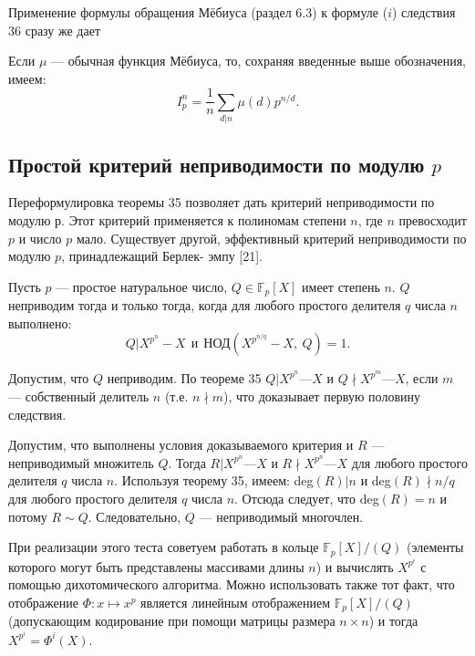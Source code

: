 Применение формулы обращения Мёбиуса (раздел 6.3) к формуле 
($i$) следствия 36 сразу же дает 

\begin{sled}
\hspace*{15pt}Если $\mu$ — обычная функция Мёбиуса, то, сохраняя введенные выше 
обозначения, имеем: 
\begin{equation*}
I^n_p = \frac{1}{n}\sum_{d|n}\mu(d)p^{n \slash d}.
\end{equation*}
\end{sled}
\newpage

\subsection{Простой критерий неприводимости по модулю $p$}
Переформулировка теоремы 35 позволяет дать критерий  
неприводимости по модулю $р$. Этот критерий применяется к полиномам степени 
$n$, где $n$ превосходит $p$ и число $p$ мало. Существует другой,  
эффективный критерий неприводимости по модулю $p$, принадлежащий Берлек- 
эмпу [21]. \newline\newline
\begin{sled}
\hspace*{15pt}Пусть $p$ — простое натуральное число, $Q \in \mathbb{F}_p [X]$ имеет степень $n$. $Q$ 
неприводим тогда и только тогда, когда для любого простого делителя 
$q$ числа $n$ выполнено: 
\begin{equation*}
Q|X^{p^n} - X\:\: \textit{и} \:\: \text{НОД}(X^{p^{n\slash q}} - X,\:Q)=1.
\end{equation*}
\end{sled}

\begin{myproof}
Допустим, что $Q$ неприводим. По теореме 35 $Q | X^{p^n} — X$ и 
$Q \nmid X^{p^m} — X$, если $m$ — собственный делитель $n$ (т.е. $n \nmid m$), что 
доказывает первую половину следствия.
 
\noindent Допустим, что выполнены условия доказываемого критерия и $R$ — 
неприводимый множитель $Q$. Тогда $R | X^{p^n} — X$ и $R \nmid X^{p^n} — X$ для 
любого простого делителя $q$ числа $n$. Используя теорему 35, имеем: 
deg$(R) | n$ и deg$(R) \nmid n \slash q$ для любого простого делителя $q$ числа $n$. 
Отсюда следует, что deg$(R) = n$ и потому $R \sim Q$. Следовательно, 
$Q$ — неприводимый многочлен.
\end{myproof}

\begin{mynotice}
При реализации этого теста советуем работать в 
кольце $\mathbb{F}_p[X]\slash(Q)$ (элементы которого могут быть представлены 
массивами длины $n$) и вычислять $X^{p^i}$ с помощью  
дихотомического алгоритма. Можно использовать также тот факт, что  
отображение $ \Phi: x \mapsto x^p$ является линейным отображением $\mathbb{F}_p[X]\slash(Q)$ 
(допускающим кодирование при помощи матрицы размера $n \times n$) 
и тогда $X^{p^i} = \Phi^i(X)$.\newline 
\end{mynotice}

